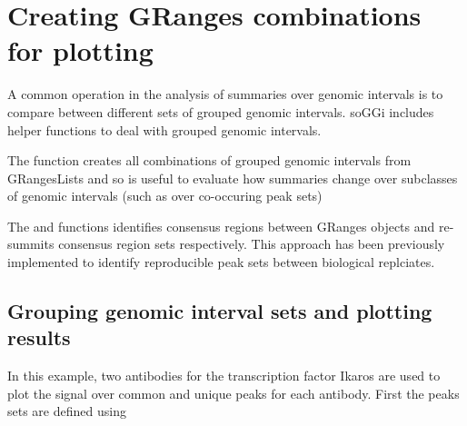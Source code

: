 \documentclass[12pt]{article}\usepackage[]{graphicx}\usepackage[usenames,dvipsnames]{color}
\begin{document}
\section{Creating GRanges combinations for plotting}



A common operation in the analysis of summaries over genomic intervals is to compare between different sets of grouped genomic intervals. soGGi includes helper functions to deal with grouped genomic intervals.

The  function creates all combinations of grouped genomic intervals from GRangesLists and so is useful to evaluate how summaries change over subclasses of genomic intervals (such as over co-occuring peak sets)

The  and  functions identifies consensus regions between GRanges objects and re-summits consensus region sets respectively. This approach has been previously implemented to identify reproducible peak sets between biological replciates.

\subsection{Grouping genomic interval sets and plotting results}


In this example, two antibodies for the transcription factor Ikaros are used to plot the signal over common and unique peaks for each antibody. First the peaks sets are defined using 
\end{document}
